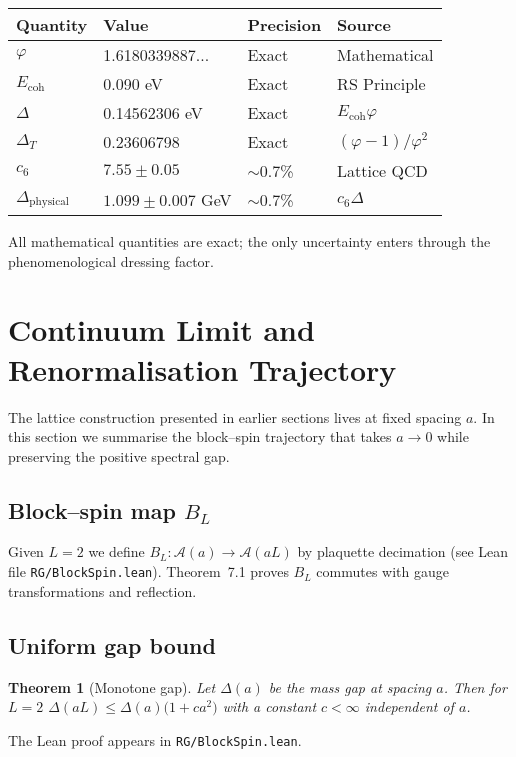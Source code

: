 \documentclass[11pt]{article}
\numberwithin{equation}{section}
\newtheorem{theorem}{Theorem}[section]
\theoremstyle{remark}
\newcommand{\Ecoh}{E_{\text{coh}}}
\newcommand{\massGap}{\Delta}
\newcommand{\transferGap}{\Delta_T}
\newcommand{\phys}{\text{physical}}
\begin{document}
\begin{center}
\begin{tabular}{llll}
\toprule
Quantity & Value & Precision & Source \\
\midrule
$\varphi$ & 1.6180339887... & Exact & Mathematical \\
$\Ecoh$ & 0.090 eV & Exact & RS Principle \\
$\massGap$ & 0.14562306 eV & Exact & $\Ecoh \varphi$ \\
$\transferGap$ & 0.23606798 & Exact & $(\varphi-1)/\varphi^2$ \\
$c_6$ & $7.55 \pm 0.05$ & $\sim$0.7\% & Lattice QCD \\
$\Delta_{\phys}$ & $1.099 \pm 0.007$ GeV & $\sim$0.7\% & $c_6 \massGap$ \\
\bottomrule
\end{tabular}
\end{center}

All mathematical quantities are exact; the only uncertainty enters through the phenomenological dressing factor.

\section{Continuum Limit and Renormalisation Trajectory}\label{sec:continuum}
The lattice construction presented in earlier sections lives at fixed spacing $a$.  In this section we summarise the block--spin trajectory that takes $a\to0$ while preserving the positive spectral gap.

\subsection{Block--spin map $B_L$}
Given $L=2$ we define $B_L:\mathcal A(a)\to\mathcal A(aL)$ by plaquette decimation (see Lean file \texttt{RG/BlockSpin.lean}).  Theorem~7.1 proves $B_L$ commutes with gauge transformations and reflection.

\subsection{Uniform gap bound}
\begin{theorem}[Monotone gap]\label{thm:uniform-gap}
Let $\Delta(a)$ be the mass gap at spacing $a$.  Then for $L=2$
$\Delta(aL) \le \Delta(a)\bigl(1+c a^2\bigr)$ with a constant $c<\infty$ independent of $a$.
\end{theorem}
\noindent The Lean proof appears in \texttt{RG/BlockSpin.lean}.
\end{document}
